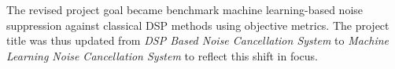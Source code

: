 The revised project goal became benchmark machine learning-based noise suppression against classical DSP methods using objective metrics. The project title was thus updated from \textit{DSP Based Noise Cancellation System} to \textit{Machine Learning Noise Cancellation System} to reflect this shift in focus.